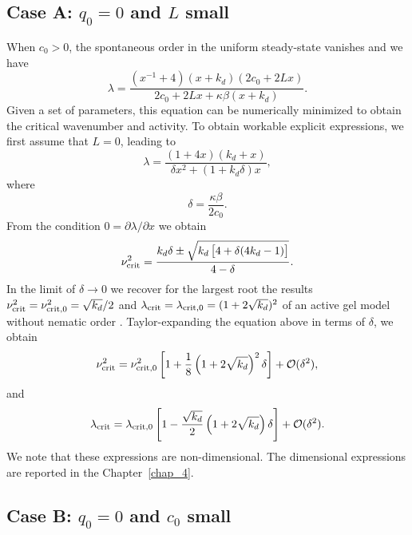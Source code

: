 \subsection{Case A: $q_0=0$ and $L$ small }
When $c_0>0$, the spontaneous order in the uniform steady-state vanishes and we have
\begin{equation}
	\lambda = \frac{(x^{-1}+4)(x + k_d)(2c_0 + 2L x)}{2c_0 + 2L x + \kappa \beta(x+k_d) }.
	\label{lam_q0}
\end{equation}
Given a set of parameters, this equation can be numerically minimized to obtain the critical wavenumber and activity. To obtain workable explicit expressions, we first assume that $L=0$, leading to
\begin{equation}
	\lambda = \frac{(1+4x)(k_d + x)}{\delta x^2 + (1+k_d \delta)x},
\end{equation}
where
\begin{equation}
	\delta = \frac{\kappa \beta}{2c_0}.
\end{equation}
From the condition $0 = \partial \lambda/\partial x$ we obtain
\begin{equation}
	\nu^2_{\rm crit} = \frac{k_d \delta \pm \sqrt{k_d\left[4 + \delta(4k_d-1) \right]}}{4-\delta}.
\end{equation}
In the limit of $\delta \rightarrow 0$ we recover for the largest root the results $\nu^2_{\rm crit} =  \nu_{\rm crit,0}^2 = \sqrt{k_d}/2$  and $\lambda_{\rm crit} = \lambda_{\rm crit,0} = (1+2\sqrt{k_d})^2$ of an active gel model without nematic order \cite{hannezo2015}. Taylor-expanding the equation above in terms of $\delta$, we obtain
\begin{equation}
	\nu^2_{\rm crit} = \nu_{\rm crit,0}^2 \left[1 + \frac{1}{8}\left( 1 + 2 \sqrt{k_d} \right)^2 \delta \right] + \mathcal{O}(\delta^2),
\end{equation}
and
\begin{equation}
	\lambda_{\rm crit} = \lambda_{\rm crit,0} \left[1 - \frac{\sqrt{k_d}}{2}\left( 1 + 2 \sqrt{k_d} \right) \delta \right] + \mathcal{O}(\delta^2).
\end{equation}
We note that these expressions are non-dimensional. The dimensional expressions are reported in the Chapter~\ref{chap_4}.

\subsection{Case B: $q_0=0$ and $c_0$ small}

